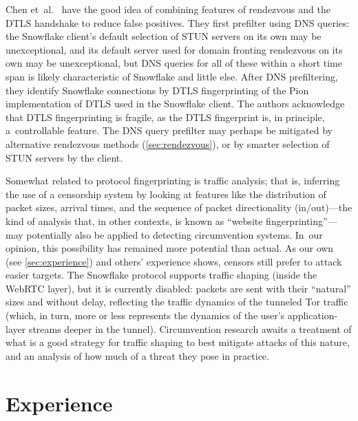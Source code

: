 \documentclass[letterpaper,twocolumn]{article}
\begin{document}
Chen et~al.~\cite{Chen2023a}
have the good idea of combining features
of rendezvous and the DTLS handshake
to reduce false positives.
They first prefilter using DNS queries:
the Snowflake client's default selection of STUN servers
on its own may be unexceptional,
and its default server used for domain fronting rendezvous
on its own may be unexceptional,
but DNS queries for all of these within a short time span
is likely characteristic of Snowflake and little else.
After DNS prefiltering, they identify Snowflake connections
by DTLS fingerprinting of the Pion implementation of DTLS
used in the Snowflake client.
The authors acknowledge that DTLS fingerprinting
is fragile, as the DTLS fingerprint is, in principle,
a~controllable feature.
The DNS query prefilter may perhaps be mitigated
by alternative rendezvous methods (\autoref{sec:rendezvous}),
or by smarter selection of STUN servers by the client.

Somewhat related to protocol fingerprinting is traffic analysis;
that is, inferring the use of a censorship system
by looking at features like the distribution of packet sizes,
arrival times, and the sequence of packet directionality (in/out)---the
kind of analysis that, in other contexts, is known as ``website fingerprinting''---may
potentially also be applied to detecting circumvention systems.
In~our opinion, this possibility has remained more potential than actual.
As our own (see \autoref{sec:experience}) and others' experience shows,
censors still prefer to attack easier targets.
The Snowflake protocol supports traffic shaping (inside the WebRTC layer),
but it is currently disabled:
packets are sent with their ``natural'' sizes and without delay,
reflecting the traffic dynamics of the tunneled Tor traffic
(which, in turn, more or less represents the dynamics
of the user's application-layer streams deeper in the tunnel).
Circumvention research awaits a treatment of
what is a good strategy for traffic shaping to
best mitigate attacks of this nature,
and an analysis of how much of a threat they pose in practice.

\section{Experience}
\label{sec:experience}

\end{document}

